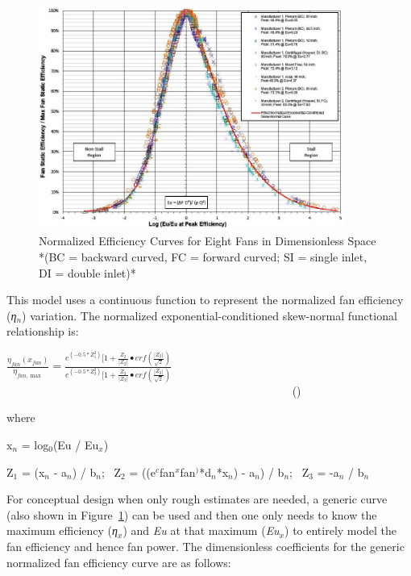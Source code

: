 \begin{figure}[hbtp] %
\centering
\includegraphics[width=0.9\textwidth, height=0.9\textheight, keepaspectratio=true]{media/image4895.png}
\caption{Normalized Efficiency Curves for Eight Fans in Dimensionless Space *(BC = backward curved, FC = forward curved; SI = single inlet, DI = double inlet)* \protect \label{fig:normalized-efficiency-curves-for-eight-fans}}
\end{figure}

This model uses a continuous function to represent the normalized fan efficiency (\emph{η\(_{n}\)}) variation. The normalized exponential-conditioned skew-normal functional relationship is:

\(\frac{{{\eta_{fan}}({x_{fan}})}}{{{\eta_{fan,\max }}}} = \frac{{{e^{( - 0.5*Z_1^2)}}[1 + \frac{{{Z_2}}}{{\left| {{Z_2}} \right|}} \bullet erf\left( {\frac{{\left| {{Z_2}} \right|}}{{\sqrt 2 }}} \right)}}{{{e^{( - 0.5*Z_3^2)}}[1 + \frac{{{Z_3}}}{{\left| {{Z_3}} \right|}} \bullet erf\left( {\frac{{\left| {{Z_3}} \right|}}{{\sqrt 2 }}} \right)}}\) ~~~~~~~~~~~~~~~~~~~~~~~~~~~~~~~~~~~~~~~~~~~~~~~~~~ ()

where

x\(_{n}\) = log\(_{0}\)(Eu / Eu\(_{x}\))

Z\(_{1}\) = (x\(_{n}\) - a\(_{n}\)) / b\(_{n}\);~ Z\(_{2}\) = ((e\(^{c}\)fan\(^{x}\)fan\(^{)}\)*d\(_{n}\)*x\(_{n}\)) - a\(_{n}\)) / b\(_{n}\);~ Z\(_{3}\) = -a\(_{n}\) / b\(_{n}\)

For conceptual design when only rough estimates are needed, a generic curve (also shown in Figure~\ref{fig:normalized-efficiency-curves-for-eight-fans}) can be used and then one only needs to know the maximum efficiency (\emph{η\(_{x}\)}) and \emph{Eu} at that maximum (\emph{Eu\(_{x}\)}) to entirely model the fan efficiency and hence fan power. The dimensionless coefficients for the generic normalized fan efficiency curve are as follows:


